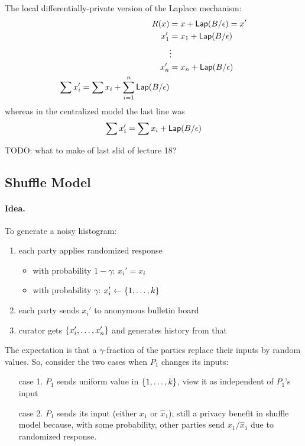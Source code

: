The local differentially-private version of the Laplace mechanism:
\begin{align*}
    R(x) &= x + \mathsf{Lap}(B/\epsilon) = x' \\
    x_1' &= x_1 + \mathsf{Lap}(B/\epsilon) \\
    &\vdots \\
    x_n' &= x_n + \mathsf{Lap}(B/\epsilon) \\
    \sum x_i' = \sum x_i + \sum_{i=1}^n \mathsf{Lap}(B/\epsilon)
\end{align*}
whereas in the centralized model the last line was 
\[
    \sum x_i' = \sum x_i + \mathsf{Lap}(B/\epsilon)
\]

TODO: what to make of last slid of lecture 18?


\subsection{Shuffle Model}


\paragraph{Idea.} To generate a noisy histogram:
\begin{enumerate}
\item each party applies randomized response
\begin{itemize}
    \item with probability $1 - \gamma$: $x_i' = x_i$
    \item with probability $\gamma$: $x_i' \gets \left\{1, \dots, k\right\}$
\end{itemize}
\item each party sends $x_i'$ to anonymous bulletin board
\item curator gets $\left\{x_i', \dots, x_n'\right\}$ and generates history from that
\end{enumerate}

The expectation is that a $\gamma$-fraction of the parties replace their inputs by random values.
So, consider the two cases when $P_1$ changes its inputs:
\begin{itemize}
\item[case 1.] $P_1$ sends uniform value in $\left\{1, \dots, k\right\}$, view it as independent of $P_1$'s input
\item[case 2.] $P_1$ sends its input (either $x_1$ or $\hat{x}_1$);
still a privacy benefit in shuffle model because, with some probability, other parties send $x_1/\hat{x}_1$ due to randomized response.
\end{itemize}


